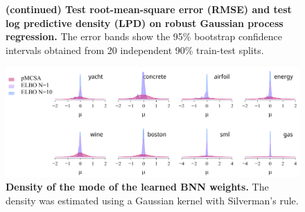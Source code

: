 %
\newpage
\begin{figure}[ht]
  \vspace{0.05in}\\
   \vspace{0.05in}\\
  \caption{\textbf{(continued) Test root-mean-square error (RMSE) and test log predictive density (LPD) on robust Gaussian process regression.}
  The error bands show the 95\% bootstrap confidence intervals obtained from 20 independent 90\% train-test splits.
  }
\end{figure}
%
\begin{figure}[H]
  \vspace{-0.10in}
  \centering
  \includegraphics[scale=0.9]{figures/pruning_02.pdf}
  \vspace{-0.05in}
  \caption{\textbf{
      Density of the mode of the learned BNN weights.
    }
    The density was estimated using a Gaussian kernel with Silverman's rule.
  }
\end{figure}

